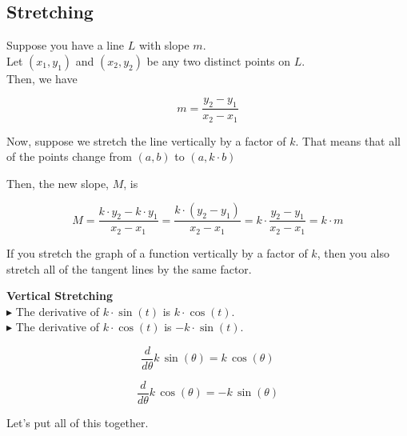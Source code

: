 \documentclass{ximera}
\begin{document}
\subsection{Stretching}


Suppose you have a line $L$ with slope $m$. \\

Let $(x_1, y_1)$ and $(x_2, y_2)$ be any two distinct points on $L$. \\

Then, we have


\[
m = \frac{y_2 - y_1}{x_2 - x_1}
\]






Now, suppose we stretch the line vertically by a factor of $k$.  That means that all of the points change from $(a, b)$ to $(a, k \cdot b)$

Then, the new slope, $M$, is 



\[
M = \frac{k \cdot y_2 - k \cdot y_1}{x_2 - x_1} = \frac{k \cdot (y_2 - y_1)}{x_2 - x_1} = k \cdot \frac{y_2 - y_1}{x_2 - x_1} = k \cdot m
\]


If you stretch the graph of a function vertically by a factor of $k$, then you also stretch all of the tangent lines by the same factor.


\begin{observation} \textbf{\textcolor{purple!85!blue}{Vertical Stretching}}   \\

$\blacktriangleright$ The derivative of $k \cdot \sin(t)$ is $k \cdot \cos(t)$. \\

$\blacktriangleright$ The derivative of $k \cdot \cos(t)$ is $-k \cdot \sin(t)$. \\

\end{observation}




\begin{notation}

\[
\frac{d}{d\theta} k \, \sin(\theta) = k \, \cos(\theta)
\]

\[
\frac{d}{d\theta} k \, \cos(\theta) = -k \, \sin(\theta)
\]

\end{notation}








Let's put all of this together.
\end{document}
